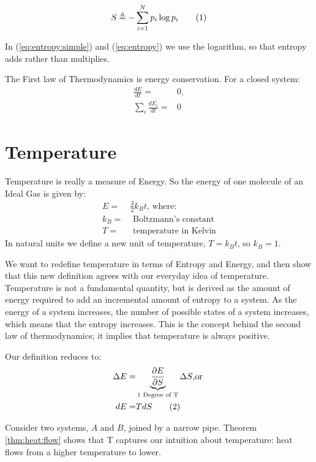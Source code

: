 \documentclass[]{article}
\newcommand\numberthis{\addtocounter{equation}{1}\tag{\theequation}}
\begin{document}
\begin{align*}
S \triangleq - \sum_{i=1}^{N} p_i \log{p_i} \numberthis \label{eq:entropy}
\end{align*}


In (\ref{eq:entropy:simple}) and (\ref{eq:entropy}) we use the logarithm, so that entropy adds rather than multiplies.

The First law of Thermodynamics is energy conservation. For a closed system:
\begin{align*}
\frac{dE}{dt} =& 0, \text{}\\
\sum_i \frac{dE_i}{dt} =& 0
\end{align*}


\section{Temperature}

Temperature is really a measure of Energy. So the energy of one molecule of an Ideal Gas is given by:
\begin{align*}
E =& \frac{3}{2} k_B t\text{, where:}\\
k_B =& \text{ Boltzmann's constant}\\
T =& \text{ temperature in Kelvin}
\end{align*}
 In natural units we define a new unit of temperature, $T=k_Bt$, so $k_B=1$.
 
 We want to redefine temperature in terms of Entropy and Energy, and then show that this new definition agrees with our everyday idea of temperature. Temperature is not a fundamental quantity, but is derived as the amount of energy required to add an incremental amount of entropy to a system.  As the energy of a system increases, the number of possible states of a system increases, which means that the entropy increases.  This is the concept behind the second law of thermodynamics; it implies that temperature is always positive.
 
 Our definition reduces to:
\begin{align*}
\Delta E =& \underbrace{\frac{\partial E}{\partial S}}_\text{1 Degree of T} \Delta S\text{,or }\\
dE =& T dS \numberthis \label{eq:T}
\end{align*}

Consider two systems, $A$ and $B$, joined by a narrow pipe. Theorem \ref{thm:heat:flow} shows that T captures our intuition about temperature: heat flows from a higher temperature to lower.
\end{document}
